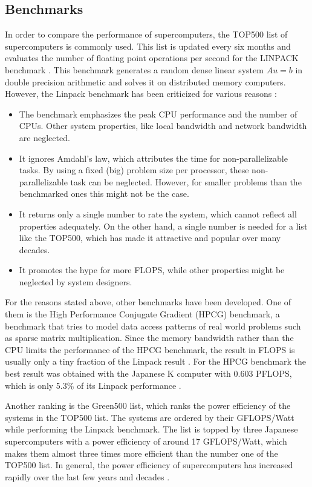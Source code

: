 \subsection{Benchmarks}
In order to compare the performance of supercomputers, the TOP500 list of supercomputers is commonly used. This list is updated every six months and evaluates the number of floating point operations per second for the LINPACK benchmark \cite{linpack}. This benchmark generates a random dense linear system $Au = b$ in double precision arithmetic and solves it on distributed memory computers. However, the Linpack benchmark has been criticized for various reasons \cite{dongarra2007hpc}:
\begin{itemize}
\item The benchmark emphasizes the peak CPU performance and the number of CPUs. Other system properties, like local bandwidth and network bandwidth are neglected.
\item It ignores Amdahl's law, which attributes the time for non-parallelizable tasks. By using a fixed (big) problem size per processor, these non-parallelizable task can be neglected. However, for smaller problems than the benchmarked ones this might not be the case.
\item It returns only a single number to rate the system, which cannot reflect all properties adequately. On the other hand, a single number is needed for a list like the TOP500, which has made it attractive and popular over many decades.
\item It promotes the hype for more FLOPS, while other properties might be neglected by system designers.  
\end{itemize}

For the reasons stated above, other benchmarks have been developed. One of them is the High Performance Conjugate Gradient (HPCG) benchmark, a benchmark that tries to model data access patterns of real world problems such as sparse matrix multiplication. Since the memory bandwidth rather than the CPU limits the performance of the HPCG benchmark, the result in FLOPS is usually only a tiny fraction of the Linpack result \cite{dongarra2013toward}. For the HPCG benchmark the best result was obtained with the Japanese K computer with 0.603 PFLOPS, which is only 5.3\% of its Linpack performance \cite{HPCG}.


Another ranking is the Green500 list, which ranks the power efficiency of the systems in the TOP500 list. The systems are ordered by their GFLOPS/Watt while performing the Linpack benchmark. The list is topped by three Japanese supercomputers with a power efficiency of around 17 GFLOPS/Watt, which makes them almost three times more efficient than the number one of the TOP500 list. In general, the power efficiency of supercomputers has increased rapidly over the last few years and decades \cite{green500}. 


